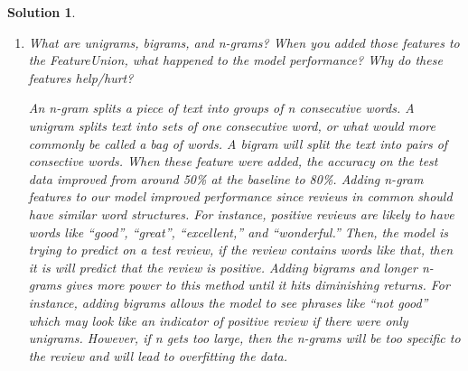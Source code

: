 \documentclass[12pt]{article}
\newtheorem*{solution*}{Solution}
\theoremstyle{definition}
\begin{document}
\begin{solution*}
\begin{enumerate}[label=\arabic*.,font=\upshape]
			\item \textnormal{What are unigrams, bigrams, and n-grams? When you added those features to the FeatureUnion,
				what happened to the model performance? Why do these features help/hurt?}
			
			An n-gram splits a piece of text into groups of n consecutive words. A unigram splits text into sets of one consecutive word, or what would more commonly be called a bag of words. A bigram will split the text into pairs of consective words. When these feature were added, the accuracy on the test data improved from around 50\% at the baseline to 80\%. Adding n-gram features to our model improved performance since reviews in common should have similar word structures. For instance, positive reviews are likely to have words like ``good'', ``great'', ``excellent,'' and ``wonderful.'' Then, the model is trying to predict on a test review, if the review contains words like that, then it is will predict that the review is positive. Adding bigrams and longer n-grams gives more power to this method until it hits diminishing returns. For instance, adding bigrams allows the model to see phrases like ``not good'' which may look like an indicator of positive review if there were only unigrams. However, if n gets too large, then the n-grams will be too specific to the review and will lead to overfitting the data. 
		\end{enumerate}
	\end{solution*}
\end{document}

